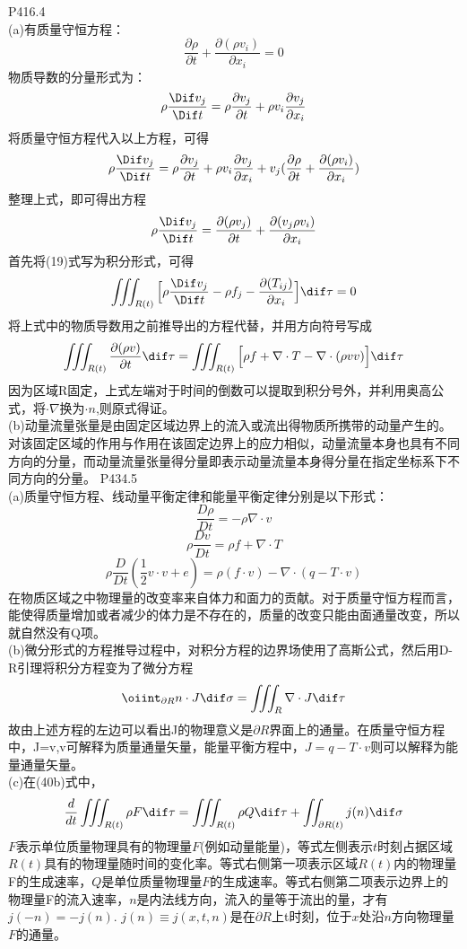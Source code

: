 \documentclass[12pt]{article}
\begin{document}
{P416.4}
\\(a)有质量守恒方程：
$$
\frac{\partial \rho}{\partial t} + \frac{\partial(\rho v_i)}{\partial x_i}=0
$$
物质导数的分量形式为：
$$
\rho\frac{\Dif  v_j}{\Dif t}=\rho\frac{\partial v_j}{\partial t} + \rho v_i\frac{\partial v_j}{\partial x_i}
$$
将质量守恒方程代入以上方程，可得
$$
\rho\frac{\Dif  v_j}{\Dif t}=\rho\frac{\partial v_j}{\partial t} + \rho v_i\frac{\partial v_j}{\partial x_i} + v_j (\frac{\partial \rho}{\partial t} + \frac{\partial(\rho v_i)}{\partial x_i})
$$
整理上式，即可得出方程
$$
\rho\frac{\Dif  v_j}{\Dif t}=\frac{\partial(\rho v_j)}{\partial t}+\frac{\partial (v_j\rho v_i)}{\partial x_i}
$$
首先将(19)式写为积分形式，可得
$$
\iiint_{R(t)}\Big[\rho\frac{\Dif  v_j}{\Dif t} - \rho f_j - \frac{\partial(T_{ij})}{\partial x_i}\Big] \dif \tau = 0
$$
将上式中的物质导数用之前推导出的方程代替，并用方向符号写成
$$
\iiint_{R(t)} \frac{\partial (\rho v)}{\partial t} \dif \tau = 
\iiint_{R(t)} \Big[\rho f + \nabla\cdot T - \nabla\cdot(\rho vv)\Big]\dif \tau
$$
因为区域R固定，上式左端对于时间的倒数可以提取到积分号外，并利用奥高公式，将$\cdot \nabla$换为$\cdot n$,则原式得证。
\\(b)动量流量张量是由固定区域边界上的流入或流出得物质所携带的动量产生的。对该固定区域的作用与作用在该固定边界上的应力相似，动量流量本身也具有不同方向的分量，而动量流量张量得分量即表示动量流量本身得分量在指定坐标系下不同方向的分量。
\newpage
{P434.5}
\\(a)质量守恒方程、线动量平衡定律和能量平衡定律分别是以下形式：
$$\frac{D\rho}{Dt} = -\rho\nabla\cdot v$$
$$\rho\frac{Dv}{Dt} = \rho f + \nabla\cdot T$$
$$\rho\frac{D}{Dt}(\frac{1}{2}v\cdot v+e) = \rho(f\cdot v)-\nabla\cdot(q-T\cdot v)$$
在物质区域之中物理量的改变率来自体力和面力的贡献。对于质量守恒方程而言，能使得质量增加或者减少的体力是不存在的，质量的改变只能由面通量改变，所以就自然没有Q项。
\\(b)微分形式的方程推导过程中，对积分方程的边界场使用了高斯公式，然后用D-R引理将积分方程变为了微分方程
$$\oiint_{\partial R}n\cdot J \dif \sigma = \iiint_{R}\nabla\cdot J\dif \tau$$
故由上述方程的左边可以看出J的物理意义是$\partial R$界面上的通量。在质量守恒方程中，J=v,v可解释为质量通量矢量，能量平衡方程中，$J = q-T\cdot v$则可以解释为能量通量矢量。
\\(c)在(40b)式中，
$$\frac{d}{dt}\iiint_{R(t)}\rho F\dif \tau = 
\iiint_{R(t)}\rho Q\dif \tau + \iint_{\partial R(t)}j(n) \dif \sigma$$
$F$表示单位质量物理具有的物理量$F$(例如动量能量)，等式左侧表示$t$时刻占据区域$R(t)$具有的物理量随时间的变化率。等式右侧第一项表示区域$R(t)$内的物理量F的生成速率，$Q$是单位质量物理量$F$的生成速率。等式右侧第二项表示边界上的物理量F的流入速率，$n$是内法线方向，流入的量等于流出的量，才有$j(-n)=-j(n)$. $j(n)\equiv j(x,t,n)$是在$\partial R$上t时刻，位于$x$处沿$n$方向物理量$F$的通量。

\nocite{*}


\end{document}
